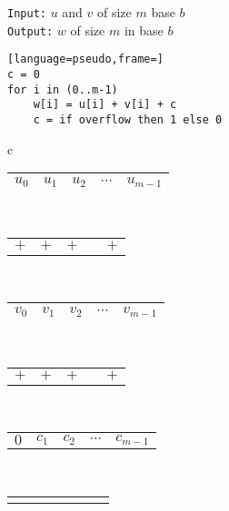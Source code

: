 \begin{figure}
  \centering
  \begin{minipage}{0.45\textwidth}
    \small
    \texttt{Input:} $u$ and $v$ of size $m$ base $b$\\
    \texttt{Output:} $w$ of size $m$ in base $b$
\begin{lstlisting}[language=pseudo,frame=]
c = 0
for i in (0..m-1)
    w[i] = u[i] + v[i] + c
    c = if overflow then 1 else 0
\end{lstlisting}
  \end{minipage}
  \begin{minipage}{0.45\textwidth}
    \centering
    \footnotesize
    \begin{tabular}{c}
      \begin{tabular}{|C{0.7cm}|C{0.7cm}|C{0.7cm}|C{0.7cm}|C{0.7cm}|}
        \hline
        $u_0$ & $u_1$ & $u_2$ & $\cdots$ & $u_{m-1}$\\ 
        \hline
      \end{tabular}\\
      \begin{tabular}{C{0.7cm}C{0.7cm}C{0.7cm}C{0.7cm}C{0.7cm}}
        $+$ & $+$ & $+$ & & $+$\\ 
      \end{tabular}\\
      \begin{tabular}{|C{0.7cm}|C{0.7cm}|C{0.7cm}|C{0.7cm}|C{0.7cm}|}
        \hline
        $v_0$ & $v_1$ & $v_2$ & $\cdots$ & $v_{m-1}$\\
        \hline
      \end{tabular}\\
      \begin{tabular}{C{0.7cm}C{0.7cm}C{0.7cm}C{0.7cm}C{0.7cm}}
        $+$ & $+$ & $+$ &  & $+$\\
      \end{tabular}\\
      \begin{tabular}{C{0.7cm}C{0.7cm}C{0.7cm}C{0.7cm}C{0.7cm}}
        $0$ & $c_1$ &  $c_2$ & $\cdots$ &$c_{m-1}$ \\
      \end{tabular}\\[-0.8ex]
      \begin{tabular}{C{0.15cm}C{0.15cm}C{0.15cm}C{0.15cm}C{0.15cm}C{0.15cm}C{0.15cm}}
       \diagonalarrow{} & & \diagonalarrow{} &  & \diagonalarrow{} &  & \diagonalarrow{}\\
      \end{tabular}\\[-2ex]

\end{tabular}
\end{minipage}
\end{figure}
